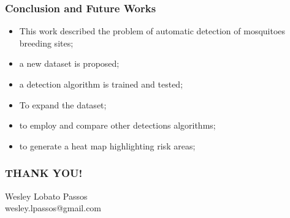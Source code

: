 \documentclass{beamer}
\begin{document}
		\begin{frame}
			\frametitle{Conclusion and Future Works}

		\begin{itemize}
			\item This work described the problem of automatic detection of mosquitoes breeding sites;
			\item a new dataset is proposed;
			\item a detection algorithm is trained and tested;
		\end{itemize}

		\begin{itemize}
			\item To expand the dataset;
			\item to employ and compare other detections algorithms;
			\item to generate a heat map highlighting risk areas;
		\end{itemize}

		\end{frame}


		\begin{frame}
			\frametitle{THANK YOU!}
			\centering
			Wesley Lobato Passos\\
			wesley.lpassos@gmail.com
		\end{frame}
\end{document}
